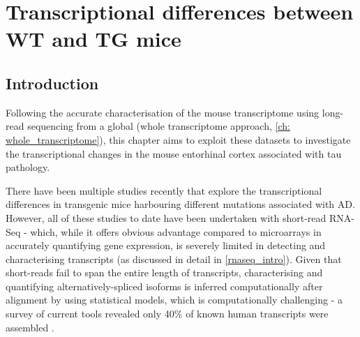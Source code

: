 \chapter{Transcriptional differences between WT and TG mice}\label{ch: transcriptional_global_differences}

\section{Introduction}

Following the accurate characterisation of the mouse transcriptome using long-read sequencing from a global (whole transcriptome approach, \cref{ch: whole_transcriptome}), this chapter aims to exploit these datasets to investigate the transcriptional changes in the mouse entorhinal cortex associated with tau pathology. 

There have been multiple studies recently that explore the transcriptional differences in transgenic mice harbouring different mutations associated with AD. However, all of these studies to date have been undertaken with short-read RNA-Seq - which, while it offers obvious advantage compared to microarrays in accurately quantifying gene expression, is severely limited in detecting and characterising transcripts (as discussed in detail in \cref{rnaseq_intro}). Given that short-reads fail to span the entire length of transcripts, characterising and quantifying alternatively-spliced isoforms is inferred computationally after alignment by using statistical models, which is computationally challenging - a survey of current tools revealed only 40\% of known human transcripts were assembled \cite{Steijger2013}.  

